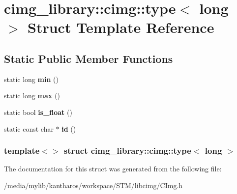 \hypertarget{structcimg__library_1_1cimg_1_1type_3_01long_01_4}{
\section{cimg\_\-library::cimg::type$<$ long $>$ Struct Template Reference}
\label{structcimg__library_1_1cimg_1_1type_3_01long_01_4}
}
\subsection*{Static Public Member Functions}
\begin{DoxyCompactItemize}
\item 
\hypertarget{structcimg__library_1_1cimg_1_1type_3_01long_01_4_afe90ecbbafdc1983746676722b1deb64}{
static long {\bfseries min} ()}
\label{structcimg__library_1_1cimg_1_1type_3_01long_01_4_afe90ecbbafdc1983746676722b1deb64}

\item 
\hypertarget{structcimg__library_1_1cimg_1_1type_3_01long_01_4_ab11af855b5c2b0d00df54d66e9388748}{
static long {\bfseries max} ()}
\label{structcimg__library_1_1cimg_1_1type_3_01long_01_4_ab11af855b5c2b0d00df54d66e9388748}

\item 
\hypertarget{structcimg__library_1_1cimg_1_1type_3_01long_01_4_a120569f4bf9429feddcfb0694885fe4f}{
static bool {\bfseries is\_\-float} ()}
\label{structcimg__library_1_1cimg_1_1type_3_01long_01_4_a120569f4bf9429feddcfb0694885fe4f}

\item 
\hypertarget{structcimg__library_1_1cimg_1_1type_3_01long_01_4_a2949c1d8786f8c2df03379ac1ab89ebf}{
static const char $\ast$ {\bfseries id} ()}
\label{structcimg__library_1_1cimg_1_1type_3_01long_01_4_a2949c1d8786f8c2df03379ac1ab89ebf}

\end{DoxyCompactItemize}
\subsubsection*{template$<$$>$ struct cimg\_\-library::cimg::type$<$ long $>$}



The documentation for this struct was generated from the following file:\begin{DoxyCompactItemize}
\item 
/media/mylib/kantharos/workspace/STM/libcimg/CImg.h\end{DoxyCompactItemize}
